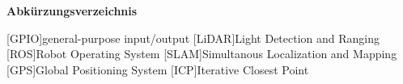 \Huge\bf Abkürzungsverzeichnis \\
\normalsize\rm

\begin{acronym}

[GPIO]{general-purpose input/output}
[LiDAR]{Light Detection and Ranging}
[ROS]{Robot Operating System}
[SLAM]{Simultanous Localization and Mapping}
[GPS]{Global Positioning System}
[ICP]{Iterative Closest Point}
    
\end{acronym}

\newpage